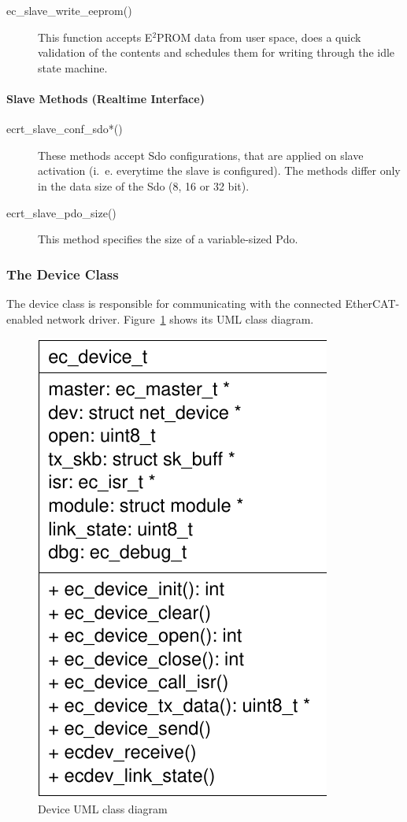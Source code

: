\documentclass[a4paper,12pt,BCOR6mm,bibtotoc,idxtotoc]{scrbook}
\begin{document}
\begin{description}
\item[ec\_slave\_write\_eeprom()] This function accepts E$^2$PROM data
  from user space, does a quick validation of the contents and
  schedules them for writing through the idle state machine.
\end{description}

\paragraph{Slave Methods (Realtime Interface)}

\begin{description}
\item[ecrt\_slave\_conf\_sdo*()] These methods accept Sdo
  configurations, that are applied on slave activation (i.~e.
  everytime the slave is configured). The methods differ only in the
  data size of the Sdo (8, 16 or 32 bit).
\item[ecrt\_slave\_pdo\_size()] This method specifies the size of a
  variable-sized Pdo.
\end{description}


\subsubsection{The Device Class}
\label{sec:class-device}

The device class is responsible for communicating with the connected
EtherCAT-enabled network driver. Figure~\ref{fig:uml-device} shows its
UML class diagram.

\begin{figure}[htbp]
  \centering
  \includegraphics[width=.3\textwidth]{images/uml-device}
  \caption{Device UML class diagram}
  \label{fig:uml-device}
\end{figure}
\end{document}
